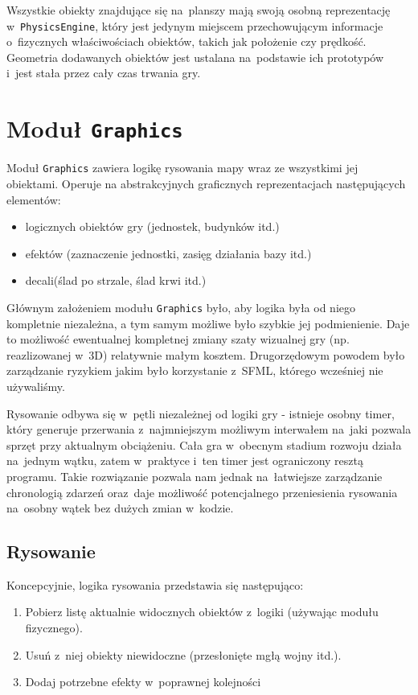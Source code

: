 \documentclass[licencjacka]{pracamgr}
\begin{document}
    Wszystkie obiekty znajdujące się na~planszy mają swoją osobną reprezentację w~\texttt{PhysicsEngine}, który jest jedynym miejscem
    przechowującym informacje o~fizycznych właściwościach obiektów, takich jak położenie czy prędkość. Geometria dodawanych obiektów
    jest ustalana na~podstawie ich prototypów i~jest stała przez cały czas trwania gry.

  \section{Moduł \texttt{Graphics}}
    Moduł \texttt{Graphics} zawiera logikę rysowania mapy wraz ze wszystkimi jej obiektami. Operuje na
    abstrakcyjnych graficznych reprezentacjach następujących elementów:
    \begin{itemize}
     \item logicznych obiektów gry (jednostek, budynków itd.)
     \item efektów (zaznaczenie jednostki, zasięg działania bazy itd.)
     \item decali\protect\footnotemark (ślad po strzale, ślad krwi itd.)
    \end{itemize}

    Głównym założeniem modułu \texttt{Graphics} było, aby logika była od niego kompletnie niezależna, a tym samym możliwe
    było szybkie jej podmienienie. Daje to możliwość ewentualnej kompletnej zmiany szaty wizualnej gry (np. reazlizowanej w~3D)
    relatywnie małym kosztem. Drugorzędowym powodem było zarządzanie ryzykiem jakim było korzystanie z~SFML, którego wcześniej
    nie używaliśmy.

    Rysowanie odbywa się w~pętli niezależnej od logiki gry - istnieje osobny timer, który generuje
    przerwania z~najmniejszym możliwym interwałem na~jaki pozwala sprzęt przy aktualnym obciążeniu. Cała gra w~obecnym
    stadium rozwoju działa na~jednym wątku, zatem w~praktyce i~ten timer jest ograniczony resztą programu. Takie
    rozwiązanie pozwala nam jednak na~łatwiejsze zarządzanie chronologią zdarzeń oraz~daje możliwość potencjalnego
    przeniesienia rysowania na~osobny wątek bez dużych zmian w~kodzie.

    \subsection{Rysowanie}
      Koncepcyjnie, logika rysowania przedstawia się następująco:
      \begin{enumerate}
       \item Pobierz listę aktualnie widocznych obiektów z~logiki (używając modułu fizycznego).
       \item Usuń z~niej obiekty niewidoczne (przesłonięte mgłą wojny itd.).
       \item Dodaj potrzebne efekty w~poprawnej kolejności
      \end{enumerate}
\end{document}

